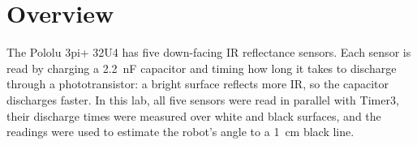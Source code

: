 \documentclass[11pt]{article}
\title{\labtitle \\[0.3em] \large \labdate}
\author{\studentname \\ \small \course{} \,}
\date{}
\begin{document}
\maketitle

\section{Overview}
The Pololu 3pi+ 32U4 has five down-facing IR reflectance sensors. Each sensor is read by charging a 2.2~nF capacitor and timing how long it takes to discharge through a phototransistor: a bright surface reflects more IR, so the capacitor discharges faster. In this lab, all five sensors were read in parallel with Timer3, their discharge times were measured over white and black surfaces, and the readings were used to estimate the robot's angle to a 1~cm black line.
\end{document}
